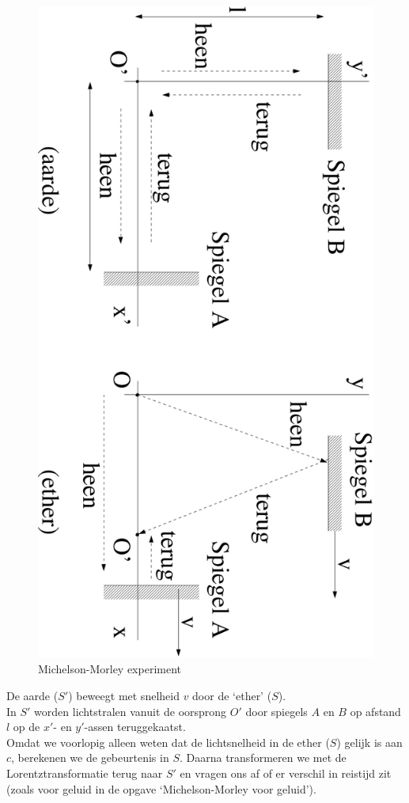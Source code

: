 \begin{figure}[ht]
\centering
\includegraphics[width=.9\textwidth]{oefeningen.pictures/michelson}
\caption{Michelson-Morley experiment}
\label{f:mm-geluid}
\end{figure}

De aarde ($S'$) beweegt met snelheid $v$ door de `ether' ($S$).\\
In $S'$ worden lichtstralen vanuit de oorsprong $O'$ door spiegels $A$ en $B$ 
op afstand $l$ op de $x'$- en $y'$-assen teruggekaatst.\\
Omdat  we  voorlopig  alleen  weten  dat  de  lichtsnelheid  in de ether 
($S$) gelijk is aan $c$, berekenen  we  de  gebeurtenis in $S$. 
Daarna transformeren we met de Lorentztransformatie terug 
naar $S'$ en vragen ons af of er verschil in reistijd zit 
(zoals voor geluid in de opgave `Michelson-Morley voor geluid').

